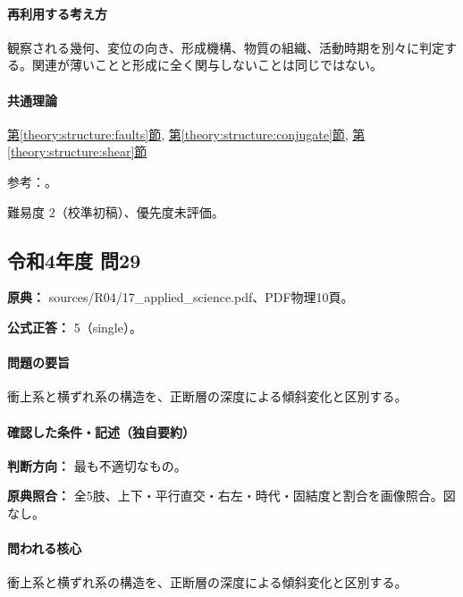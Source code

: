 \paragraph{再利用する考え方} 観察される幾何、変位の向き、形成機構、物質の組織、活動時期を別々に判定する。関連が薄いことと形成に全く関与しないことは同じではない。

\paragraph{共通理論} \hyperref[theory:structure:faults]{第\ref*{theory:structure:faults}節}, \hyperref[theory:structure:conjugate]{第\ref*{theory:structure:conjugate}節}, \hyperref[theory:structure:shear]{第\ref*{theory:structure:shear}節}

\par 参考：\cite{str_shear,str_faultrocks}。

\par 難易度 2（校準初稿）、優先度未評価。

\subsection{令和4年度 問29}
\label{q:r04-reg-applied-29}

\noindent\textbf{原典：} sources/R04/17\_applied\_science.pdf、PDF物理10頁。

\textbf{公式正答：} 5（single）。

\paragraph{問題の要旨} 衝上系と横ずれ系の構造を、正断層の深度による傾斜変化と区別する。

\paragraph{確認した条件・記述（独自要約）}\mbox{}\par

\noindent\textbf{判断方向：} 最も不適切なもの。\par

\noindent\textbf{原典照合：} 全5肢、上下・平行直交・右左・時代・固結度と割合を画像照合。図なし。\par

\paragraph{問われる核心} 衝上系と横ずれ系の構造を、正断層の深度による傾斜変化と区別する。

